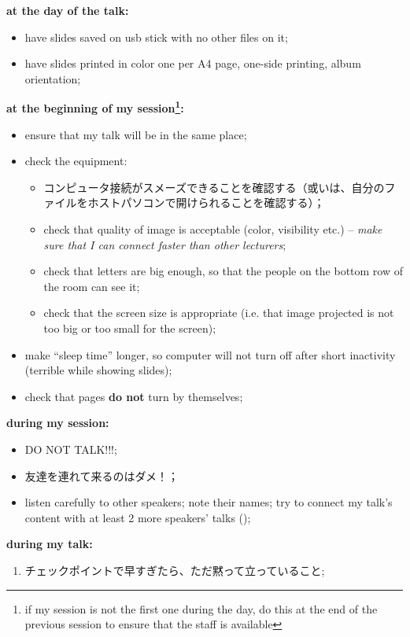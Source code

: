 \documentclass[12pt]{article} %
\begin{document}
	\textbf{at the day of the talk:}
	\begin{itemize}
		\item have slides saved on usb stick with no other files on it;
		\item have slides printed in color one per A4 page, one-side printing, album orientation;
	\end{itemize}
	\textbf{at the beginning of my session\footnote{\normalfont if my session is not the first one during the day, do this at the end of the previous session to ensure that
	the staff is available}:}
	\begin{itemize}
		\item ensure that my talk will be in the same place;
		\item check the equipment:\begin{itemize}
				\item コンピュータ接続がスメーズできることを確認する（或いは、自分のファイルをホストパソコンで開けられることを確認する）；
				\item check that quality of image is acceptable (color, visibility etc.) -- \textit{make sure that I can connect faster than other lecturers};
				\item check that letters are big enough, so that the people on the bottom row of the room can see it;
				\item check that the screen size is appropriate (i.e. that image projected is not too big or too small for the screen);
			\end{itemize}
		\item make ``sleep time'' longer, so computer will not turn off after short inactivity (terrible while showing slides);
		\item check that pages {\bf do not} turn by themselves;
	\end{itemize}
	\textbf{during my session:}
	\begin{itemize}
		\item DO NOT TALK!!!;
		\item 友達を連れて来るのはダメ！；
		\item listen carefully to other speakers; note their names; try to connect my talk's content with at least 2 more speakers' talks ();
	\end{itemize}
    \textbf{during my talk:}\begin{enumerate}
	    \item チェックポイントで早すぎたら、ただ黙って立っていること;
    \end{enumerate}
\end{document}
